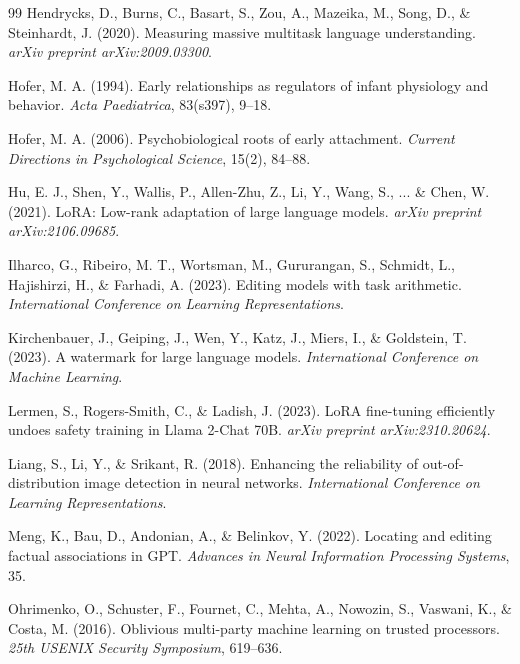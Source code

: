 \documentclass[10pt,letterpaper]{article}
\begin{document}
\begin{thebibliography}{99}
Hendrycks, D., Burns, C., Basart, S., Zou, A., Mazeika, M., Song, D., \& Steinhardt, J. (2020).
\newblock Measuring massive multitask language understanding.
\newblock \textit{arXiv preprint arXiv:2009.03300}.

Hofer, M. A. (1994).
\newblock Early relationships as regulators of infant physiology and behavior.
\newblock \textit{Acta Paediatrica}, 83(s397), 9--18.

Hofer, M. A. (2006).
\newblock Psychobiological roots of early attachment.
\newblock \textit{Current Directions in Psychological Science}, 15(2), 84--88.

Hu, E. J., Shen, Y., Wallis, P., Allen-Zhu, Z., Li, Y., Wang, S., ... \& Chen, W. (2021).
\newblock LoRA: Low-rank adaptation of large language models.
\newblock \textit{arXiv preprint arXiv:2106.09685}.

Ilharco, G., Ribeiro, M. T., Wortsman, M., Gururangan, S., Schmidt, L., Hajishirzi, H., \& Farhadi, A. (2023).
\newblock Editing models with task arithmetic.
\newblock \textit{International Conference on Learning Representations}.

Kirchenbauer, J., Geiping, J., Wen, Y., Katz, J., Miers, I., \& Goldstein, T. (2023).
\newblock A watermark for large language models.
\newblock \textit{International Conference on Machine Learning}.

Lermen, S., Rogers-Smith, C., \& Ladish, J. (2023).
\newblock LoRA fine-tuning efficiently undoes safety training in Llama 2-Chat 70B.
\newblock \textit{arXiv preprint arXiv:2310.20624}.

Liang, S., Li, Y., \& Srikant, R. (2018).
\newblock Enhancing the reliability of out-of-distribution image detection in neural networks.
\newblock \textit{International Conference on Learning Representations}.

Meng, K., Bau, D., Andonian, A., \& Belinkov, Y. (2022).
\newblock Locating and editing factual associations in GPT.
\newblock \textit{Advances in Neural Information Processing Systems}, 35.

Ohrimenko, O., Schuster, F., Fournet, C., Mehta, A., Nowozin, S., Vaswani, K., \& Costa, M. (2016).
\newblock Oblivious multi-party machine learning on trusted processors.
\newblock \textit{25th USENIX Security Symposium}, 619--636.


\end{thebibliography}
\end{document}
